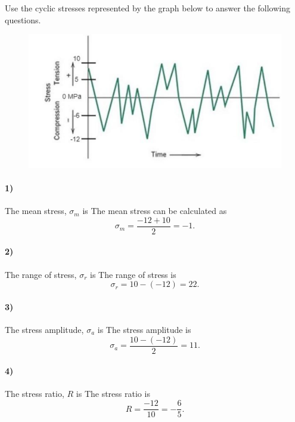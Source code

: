 
Use the cyclic stresses represented by the graph below to answer the following questions.
\begin{figure} [ht]
  \centering
  \caption{}
  \includegraphics[width=0.5\linewidth]{./figures/f10_1.png}
  \label{fig:f10_1}
\end{figure}

\paragraph{1)} The mean stress, $\sigma_m$ is
\bigbreak
The mean stress can be calculated as
\[ 
\sigma_m = \frac{-12 + 10}{2} = -1
.\]

\paragraph{2)} The range of stress, $\sigma_r$ is
\bigbreak
The range of stress is
\[ 
\sigma_r = 10 - (-12) = 22
.\]


\paragraph{3)} The stress amplitude, $\sigma_a$ is
\bigbreak
The stress amplitude is
\[ 
\sigma_a = \frac{10 - (-12)}{2} = 11
.\]


\paragraph{4)} The stress ratio, $R$ is
\bigbreak
The stress ratio is
\[ 
R = \frac{-12}{10} = -\frac{6}{5}
.\]




